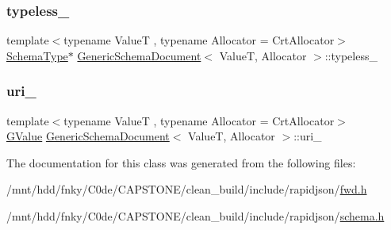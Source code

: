 \mbox{\label{classGenericSchemaDocument_a7393ecd4d607c1f81ce9eac5becf92a8}} 
\subsubsection{\texorpdfstring{typeless\+\_\+}{typeless\_}}
{\footnotesize\ttfamily template$<$typename ValueT , typename Allocator  = Crt\+Allocator$>$ \\
\hyperlink{classGenericSchemaDocument_acaf115202b159a2eb72c97c3dc6c3895}{Schema\+Type}$\ast$ \hyperlink{classGenericSchemaDocument}{Generic\+Schema\+Document}$<$ ValueT, Allocator $>$\+::typeless\+\_\+\hspace{0.3cm}{\ttfamily [private]}}

\mbox{\label{classGenericSchemaDocument_ab5574f32bd1778690ac0d2cb992c1eaf}} 
\subsubsection{\texorpdfstring{uri\+\_\+}{uri\_}}
{\footnotesize\ttfamily template$<$typename ValueT , typename Allocator  = Crt\+Allocator$>$ \\
\hyperlink{classGenericSchemaDocument_a777505b09fff6cf23b8cfed9e0350eec}{G\+Value} \hyperlink{classGenericSchemaDocument}{Generic\+Schema\+Document}$<$ ValueT, Allocator $>$\+::uri\+\_\+\hspace{0.3cm}{\ttfamily [private]}}



The documentation for this class was generated from the following files\+:\begin{DoxyCompactItemize}
\item 
/mnt/hdd/fnky/\+C0de/\+C\+A\+P\+S\+T\+O\+N\+E/clean\+\_\+build/include/rapidjson/\hyperlink{fwd_8h}{fwd.\+h}\item 
/mnt/hdd/fnky/\+C0de/\+C\+A\+P\+S\+T\+O\+N\+E/clean\+\_\+build/include/rapidjson/\hyperlink{schema_8h}{schema.\+h}\end{DoxyCompactItemize}
